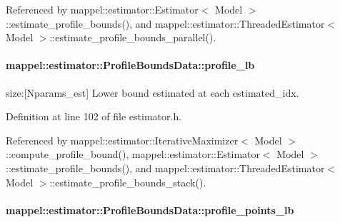 Referenced by mappel\+::estimator\+::\+Estimator$<$ Model $>$\+::estimate\+\_\+profile\+\_\+bounds(), and mappel\+::estimator\+::\+Threaded\+Estimator$<$ Model $>$\+::estimate\+\_\+profile\+\_\+bounds\+\_\+parallel().

\paragraph[{\texorpdfstring{profile\+\_\+lb}{profile_lb}}]{ mappel\+::estimator\+::\+Profile\+Bounds\+Data\+::profile\+\_\+lb}\hypertarget{structmappel_1_1estimator_1_1ProfileBoundsData_a0bc6ca65076892186f02bea98aa88268}{}\label{structmappel_1_1estimator_1_1ProfileBoundsData_a0bc6ca65076892186f02bea98aa88268}


size\+:\mbox{[}Nparams\+\_\+est\mbox{]} Lower bound estimated at each estimated\+\_\+idx. 



Definition at line 102 of file estimator.\+h.



Referenced by mappel\+::estimator\+::\+Iterative\+Maximizer$<$ Model $>$\+::compute\+\_\+profile\+\_\+bound(), mappel\+::estimator\+::\+Estimator$<$ Model $>$\+::estimate\+\_\+profile\+\_\+bounds(), and mappel\+::estimator\+::\+Threaded\+Estimator$<$ Model $>$\+::estimate\+\_\+profile\+\_\+bounds\+\_\+stack().

\paragraph[{\texorpdfstring{profile\+\_\+points\+\_\+lb}{profile_points_lb}}]{ mappel\+::estimator\+::\+Profile\+Bounds\+Data\+::profile\+\_\+points\+\_\+lb}\hypertarget{structmappel_1_1estimator_1_1ProfileBoundsData_ad6746d8a2946cba52c8c207fc0f57ef7}{}\label{structmappel_1_1estimator_1_1ProfileBoundsData_ad6746d8a2946cba52c8c207fc0f57ef7}


